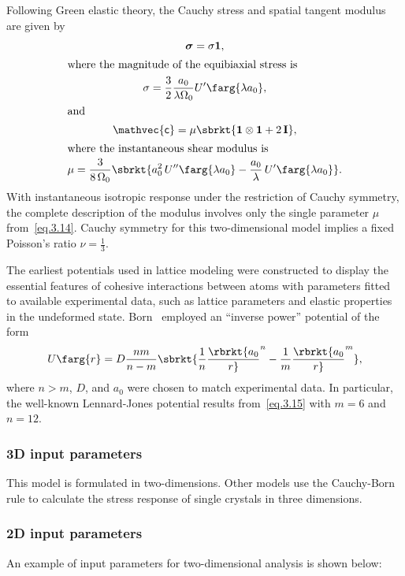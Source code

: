 Following Green elastic theory, the Cauchy stress and spatial tangent modulus are given by
\begin{gather}
\boldsymbol{\sigma} =  \sigma \mathbf{1}, \\
\intertext{where the magnitude of the equibiaxial stress is}
\sigma = {3 \over 2}{a_0 \over \lambda \Omega_0} U'\farg{\lambda a_0}, \\
\intertext{and}
\mathvec{\mathsf{c}} = \mu \sbrkt{\mathbf{1} \otimes \mathbf{1} + 2\, \mathbf{I}}, \\
\intertext{where the instantaneous shear modulus is}
\mu = {3 \over 8\,\Omega_0}
   \sbrkt{a_0^2\,U''\farg{\lambda a_0} - 
        {a_0 \over \lambda}\,U'\farg{\lambda a_0}}.
   \label{eq.3.14}
\end{gather}
With instantaneous isotropic response under the restriction of Cauchy symmetry, 
the complete description of the modulus involves only the 
single parameter $\mu$ from~\eqref{eq.3.14}. Cauchy symmetry for this
two-dimensional model implies a fixed Poisson's ratio
$\nu = \frac{1}{3}$.

The earliest potentials used in lattice modeling were constructed to display the
essential features of cohesive interactions between atoms with parameters fitted to
available experimental data, such as lattice parameters and elastic properties
in the undeformed state. Born~\cite{Born1940} employed an ``inverse power'' 
potential of the form
\begin{equation}
\label{eq.3.15}
U\farg{r} = D {nm \over {n - m}}
  \sbrkt{{1 \over n}\rbrkt{a_0 \over r}^n - {1 \over m}\rbrkt{a_0 \over r}^m},
\end{equation}
where $n > m$, $D$, and $a_0$ were chosen to match experimental data. In particular, 
the well-known Lennard-Jones potential results from~\eqref{eq.3.15} with 
$m = 6$ and $n = 12$.

\subsubsection{3D input parameters}
This model is formulated in two-dimensions. Other models use the
Cauchy-Born rule to calculate the stress response of single crystals
in three dimensions.

\subsubsection{2D input parameters}
An example of input parameters for two-dimensional analysis is shown 
below:

